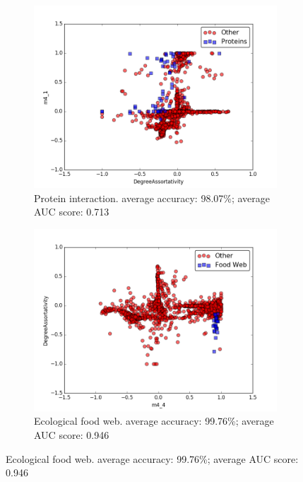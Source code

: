 \documentclass{article}
\begin{document}

\begin{figure}[H]
\begin{subfigure}{0.48\textwidth}
\includegraphics[width=\linewidth]{figs/one_by_many/protein/2d.png}
\caption{Protein interaction. average accuracy: 98.07\%; average AUC score: 0.713} \label{protein_2d}
\end{subfigure}\hspace*{\fill}
\begin{subfigure}{0.48\textwidth}
\includegraphics[width=\linewidth]{figs/one_by_many/food_web/2d.png}
\caption{Ecological food web. average accuracy: 99.76\%; average AUC score: 0.946} \label{foodweb_2d}
\end{subfigure}


\end{figure}
\end{document}
